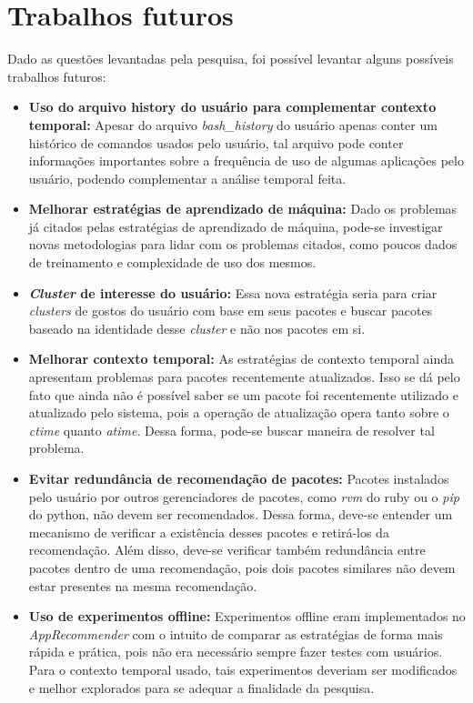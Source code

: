 \chapter[Trabalhos futuros]{Trabalhos futuros}

Dado as questões levantadas pela pesquisa, foi possível levantar alguns
possíveis trabalhos futuros:

\begin{itemize}
  \item \textbf{Uso do arquivo history do usuário para complementar contexto
  temporal:} Apesar do arquivo \textit{bash\_history} do usuário apenas conter um
  histórico de comandos usados pelo usuário, tal arquivo pode conter informações
  importantes sobre a frequência de uso de algumas aplicações pelo usuário,
  podendo complementar a análise temporal feita.
  \item \textbf{Melhorar estratégias de aprendizado de máquina:} Dado os
  problemas já citados pelas estratégias de aprendizado de máquina, pode-se
  investigar novas metodologias para lidar com os problemas citados, como poucos
  dados de treinamento e complexidade de uso dos mesmos.
  \item \textbf{\textit{Cluster} de interesse do usuário:} Essa nova estratégia seria
  para criar \textit{clusters} de gostos do usuário com base em seus pacotes e
  buscar pacotes baseado na identidade desse \textit{cluster} e não nos pacotes
  em si.
  \item \textbf{Melhorar contexto temporal:} As estratégias de contexto
  temporal ainda apresentam problemas para pacotes recentemente atualizados.
  Isso se dá pelo fato que ainda não é possível saber se um pacote foi
  recentemente utilizado e atualizado pelo sistema, pois a operação de
  atualização opera tanto sobre o \textit{ctime} quanto \textit{atime}. Dessa
  forma, pode-se buscar maneira de resolver tal problema.
  \item \textbf{Evitar redundância de recomendação de pacotes:} Pacotes
  instalados pelo usuário por outros gerenciadores de pacotes, como
  \textit{rvm} do ruby ou o \textit{pip} do python, não devem ser
  recomendados. Dessa forma, deve-se entender um mecanismo de verificar a
  existência desses pacotes e retirá-los da recomendação. Além disso, deve-se
  verificar também redundância entre pacotes dentro de uma recomendação,
  pois dois pacotes similares não devem estar presentes na mesma
  recomendação.
  \item \textbf{Uso de experimentos offline:} Experimentos offline eram
  implementados no \textit{AppRecommender} com o intuito de comparar as
  estratégias de forma mais rápida e prática, pois não era necessário
  sempre fazer testes com usuários. Para o contexto temporal usado, tais
  experimentos deveriam ser modificados e melhor explorados para se
  adequar a finalidade da pesquisa.
\end{itemize}
